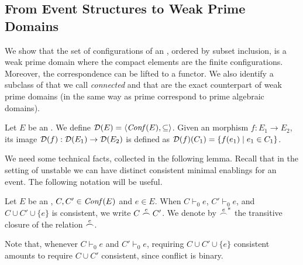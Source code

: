 \subsection{{From Event Structures to Weak Prime Domains}}
\label{ss:es-to-domain}

We show that the set of configurations of an {\esabbr}, ordered by
subset inclusion, is a weak prime domain where the compact elements
are the finite configurations.
Moreover, the
correspondence can be lifted to a functor. We also identify a subclass
of {\esabbr} that we call \emph{connected {\esabbr}} and that are the exact counterpart of
weak prime domains (in the same way as prime {\esabbr} correspond to prime
algebraic domains).


\begin{definition}
  Let ${E}$ be an {\esabbr}. We define
  $\mathcal{D}({{E}}) = \langle \mathit{Conf}({{E}}), \subseteq \rangle$.
  Given an {\esabbr} morphism $f : {E}_1 \to {E}_2$, its image
  $\mathcal{D}({f}) : \mathcal{D}({{E}_1}) \to \mathcal{D}({{E}_2})$ is defined as
  $\mathcal{D}({f})(C_1) =   \{ f(e_1) \mid e_1 \in C_1 \}$.
\end{definition}

We need some technical facts, collected in the following lemma.
Recall that in the setting of unstable {\esabbr} we can have distinct
consistent minimal enablings for an event. The following notation will be useful.

\begin{definition}
  Let $E$ be an {\esabbr}, $C, C' \in \mathit{Conf}({E})$ and $e \in E$.
  When $C \vdash_0 e$, $C' \vdash_0 e$, and $C \cup C' \cup \{ e \}$
  is consistent, we write $C \stackrel{e}{\frown} C'$. We denote by $\stackrel{e}{\frown}^*$ the
  transitive closure of the relation $\stackrel{e}{\frown}$.
\end{definition}

Note that, whenever $C \vdash_0 e$ and $C' \vdash_0 e$, requiring 
$C \cup C' \cup \{ e \}$ consistent amounts to require  $C \cup C'$ 
consistent, since conflict is binary.

